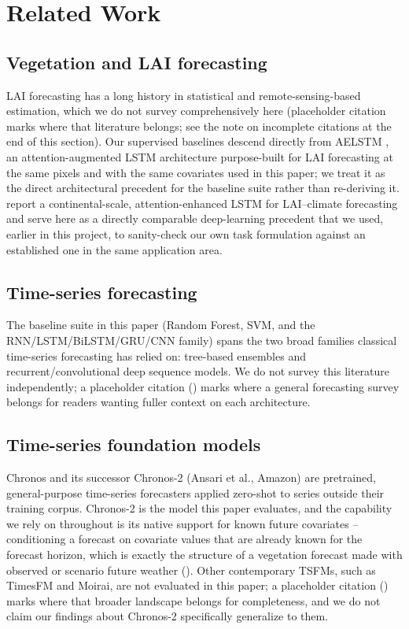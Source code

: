 \documentclass[11pt]{article}
\begin{document}
\section{Related Work}
\label{sec:related}

\subsection{Vegetation and LAI forecasting}
\label{sec:related-lai}
LAI forecasting has a long history in statistical and remote-sensing-based estimation, which we do
not survey comprehensively here (placeholder citation \cite{lai_forecasting_TODO} marks where that
literature belongs; see the note on incomplete citations at the end of this section). Our
supervised baselines descend directly from AELSTM \cite{aelstm_TODO}, an attention-augmented LSTM
architecture purpose-built for LAI forecasting at the same pixels and with the same covariates used
in this paper; we treat it as the direct architectural precedent for the baseline suite rather than
re-deriving it. \citet{lai_lstm_2024} report a continental-scale, attention-enhanced LSTM for
LAI--climate forecasting and serve here as a directly comparable deep-learning precedent that we
used, earlier in this project, to sanity-check our own task formulation against an established
one in the same application area.

\subsection{Time-series forecasting}
\label{sec:related-ts}
The baseline suite in this paper (Random Forest, SVM, and the RNN/LSTM/BiLSTM/GRU/CNN family) spans
the two broad families classical time-series forecasting has relied on: tree-based ensembles and
recurrent/convolutional deep sequence models. We do not survey this literature independently; a
placeholder citation (\cite{ts_forecasting_survey_TODO}) marks where a general forecasting survey
belongs for readers wanting fuller context on each architecture.

\subsection{Time-series foundation models}
\label{sec:related-tsfm}
Chronos \citep{ansari2024chronos} and its successor Chronos-2 \citep{ansari2025chronos2} (Ansari
et al., Amazon) are pretrained, general-purpose time-series forecasters applied zero-shot to series
outside their training corpus. Chronos-2 is the model this paper evaluates, and the capability we
rely on throughout is its native support for known future covariates -- conditioning a forecast on
covariate values that are already known for the forecast horizon, which is exactly the structure of
a vegetation forecast made with observed or scenario future weather (). Other
contemporary TSFMs, such as TimesFM and Moirai, are not evaluated in this paper; a placeholder
citation (\cite{tsfm_review_TODO}) marks where that broader landscape belongs for completeness, and
we do not claim our findings about Chronos-2 specifically generalize to them.
\end{document}
